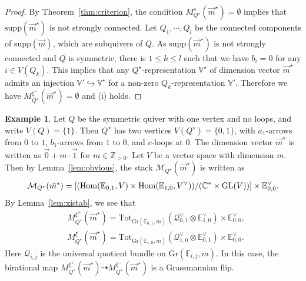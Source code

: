 \documentclass[11pt]{amsart}
\theoremstyle{plain}
\theoremstyle{definition}
\newtheorem{exam}[thm]{Example}
\theoremstyle{remark}
\newcommand{\mM}{\mathcal{M}}
\newcommand{\qQ}{\mathcal{Q}}
\newcommand{\Hom}{\mathop{\rm Hom}\nolimits}
\newcommand{\GL}{\mathop{\rm GL}\nolimits}
\begin{document}
\begin{proof}
By Theorem~\ref{thm:criterion}, 
the condition 
$M_{Q^{\star}}^{s}(\vec{m}^{\star}) = \emptyset$
implies that $\mathrm{supp}(\vec{m}^{\star})$
 is not strongly connected. 
Let $Q_1, \cdots, Q_l$ be the connected components of 
$\mathrm{supp}(\vec{m})$, which are subquivers of 
$Q$. 
As $\mathrm{supp}(\vec{m}^{\star})$ is not 
strongly connected and $Q$ is symmetric, there is 
$1\le k \le l$ such that 
we have $b_i=0$ for any $i \in V(Q_k)$. 
This implies that any 
$Q^{\star}$-representation $\mathbb{V}^{\star}$ of dimension vector 
$\vec{m}^{\star}$ admits an injection
$\mathbb{V}' \hookrightarrow \mathbb{V}^{\star}$ for a
non-zero 
$Q_k$-representation $\mathbb{V}'$. 
Therefore we have $M_{Q^{\star}}^{\xi^{-}}(\vec{m}^{\star}) = \emptyset$
and (i) holds. 
\end{proof}

\begin{exam}\label{exam:Grass}
Let $Q$ be the symmetric quiver 
with one vertex and no loops, and 
write $V(Q)=\{1\}$. 
Then $Q^{\star}$ has two vertices 
$V(Q^{\star})=\{0, 1\}$, 
with $a_1$-arrows from 
$0$ to $1$, 
$b_1$-arrows from 
$1$ to $0$, and $c$-loops at 
$0$. The dimension vector 
$\vec{m}^{\star}$ is written as
$\vec{0}+m \cdot \vec{1}$
for $m \in \mathbb{Z}_{>0}$. 
Let $V$ be a vector space with dimension $m$. 
Then by Lemma~\ref{lem:obvious}, 
the stack $\mM_{Q^{\star}}(\vec{m}^{\star})$ is written as
\begin{align*}
\mM_{Q^{\star}}(\vec{m}^{\star})
=\left[(\Hom(\mathbb{E}_{0, 1}, V) \times 
\Hom(\mathbb{E}_{1, 0}, V^{\vee}))/(\mathbb{C}^{\ast} \times \GL(V))
\right] \times \mathbb{E}_{0, 0}^{\vee}. 
\end{align*}
By Lemma~\ref{lem:xistab}, we see that
\begin{align*}
&M_{Q^{\star}}^{\xi^+}(\vec{m}^{\star})
=\mathrm{Tot}_{\mathrm{Gr}(\mathbb{E}_{0, 1}, m)}
(\qQ_{0, 1}^{\vee} \otimes \mathbb{E}_{1, 0}^{\vee}) \times 
\mathbb{E}_{0, 0}^{\vee}, \\
&M_{Q^{\star}}^{\xi^-}(\vec{m}^{\star})
=\mathrm{Tot}_{\mathrm{Gr}(\mathbb{E}_{1, 0}, m)}
(\qQ_{1, 0}^{\vee} \otimes \mathbb{E}_{0, 1}^{\vee}) \times 
\mathbb{E}_{0, 0}^{\vee}.
\end{align*}
Here $\qQ_{i, j}$ is the universal 
quotient bundle on 
$\mathrm{Gr}(\mathbb{E}_{i, j}, m)$.
In this case, the birational map
$M_{Q^{\star}}^{\xi^+}(\vec{m}^{\star})
\dashrightarrow M_{Q^{\star}}^{\xi^-}(\vec{m}^{\star})$
is a 
Grassmannian flip. 
\end{exam}
\end{document}
